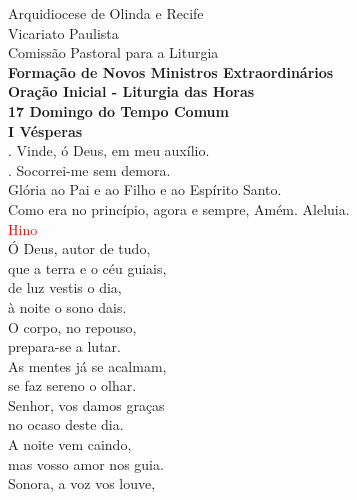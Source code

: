 \documentclass{book}
\begin{document}
\pagestyle{empty}
\begin{center}
    Arquidiocese de Olinda e Recife \\
    Vicariato Paulista \\
    Comissão Pastoral para a Liturgia
    \vspace{.2cm} \\
    \textbf{Formação de Novos Ministros Extraordinários}
    \vspace{.2cm} \\
    \textbf{Oração Inicial - Liturgia das Horas}
    \vspace{.2cm} \\
    \textbf{17\textordfeminine{} Domingo do Tempo Comum}
    \vspace{.2cm} \\
    \textbf{I Vésperas}
    \vspace{.2cm} \\
    {\color{red} \Vbar.} Vinde, ó Deus, em meu auxílio. \\
    {\color{red} \Rbar.} Socorrei-me sem demora. \\
    Glória ao Pai e ao Filho e ao Espírito Santo. \\
    Como era no princípio, agora e sempre, Amém. Aleluia.
    \vspace{.2cm} \\
    \textcolor{red}{Hino}
    \vspace{.2cm} \\
    Ó Deus, autor de tudo, \\
    que a terra e o céu guiais, \\
    de luz vestis o dia, \\
    à noite o sono dais.
    \vspace{.2cm} \\
    O corpo, no repouso, \\
    prepara-se a lutar. \\
    As mentes já se acalmam, \\
    se faz sereno o olhar.
    \vspace{.2cm} \\
    Senhor, vos damos graças \\
    no ocaso deste dia. \\
    A noite vem caindo, \\
    mas vosso amor nos guia.
    \vspace{.2cm} \\
    Sonora, a voz vos louve, \\

\end{center}
\end{document}
